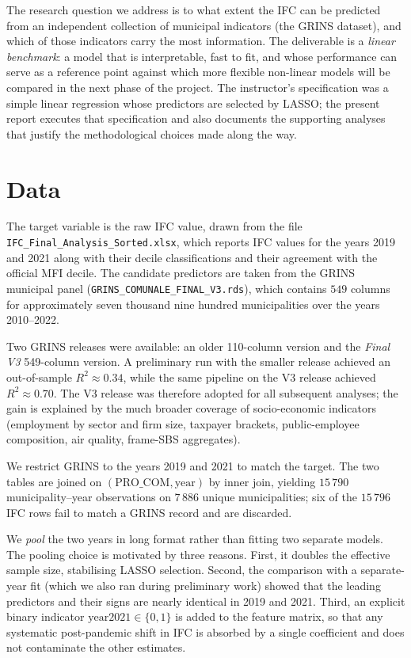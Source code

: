 \documentclass[11pt,a4paper]{article}
\begin{document}
The research question we address is to what extent the IFC can be
predicted from an independent collection of municipal indicators (the
GRINS dataset), and which of those indicators carry the most
information. The deliverable is a \emph{linear benchmark}: a model that
is interpretable, fast to fit, and whose performance can serve as a
reference point against which more flexible non-linear models will be
compared in the next phase of the project. The instructor's
specification was a simple linear regression whose predictors are
selected by LASSO; the present report executes that specification and
also documents the supporting analyses that justify the methodological
choices made along the way.

\section{Data}
\label{sec:data}

The target variable is the raw IFC value, drawn from the file
\texttt{IFC\_Final\_Analysis\_Sorted.xlsx}, which reports IFC values
for the years 2019 and 2021 along with their decile classifications and
their agreement with the official MFI decile. The candidate predictors
are taken from the GRINS municipal panel
(\texttt{GRINS\_COMUNALE\_FINAL\_V3.rds}), which contains
\(549\) columns for approximately seven thousand nine hundred
municipalities over the years 2010--2022.

Two GRINS releases were available: an older 110-column version and the
\emph{Final V3} 549-column version. A preliminary run with the smaller
release achieved an out-of-sample \(R^{2} \approx 0.34\), while the
same pipeline on the V3 release achieved \(R^{2} \approx 0.70\). The
V3 release was therefore adopted for all subsequent analyses; the gain
is explained by the much broader coverage of socio-economic
indicators (employment by sector and firm size, taxpayer brackets,
public-employee composition, air quality, frame-SBS aggregates).

We restrict GRINS to the years 2019 and 2021 to match the target. The
two tables are joined on \((\text{PRO\_COM}, \text{year})\) by inner
join, yielding \(15\,790\) municipality--year observations on
\(7\,886\) unique municipalities; six of the \(15\,796\) IFC rows fail
to match a GRINS record and are discarded.

We \emph{pool} the two years in long format rather than fitting two
separate models. The pooling choice is motivated by three reasons.
First, it doubles the effective sample size, stabilising LASSO
selection. Second, the comparison with a separate-year fit (which we
also ran during preliminary work) showed that the leading predictors
and their signs are nearly identical in 2019 and 2021. Third, an
explicit binary indicator \(\text{year2021} \in \{0,1\}\) is added to
the feature matrix, so that any systematic post-pandemic shift in IFC
is absorbed by a single coefficient and does not contaminate the other
estimates.
\end{document}
